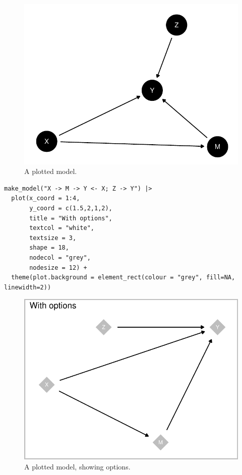\documentclass[
  article]{jss}
\begin{document}
\begin{figure}[H]

{\centering \includegraphics{paper_files/figure-pdf/unnamed-chunk-16-1.pdf}

}

\caption{A plotted model.}

\end{figure}

\begin{verbatim}
make_model("X -> M -> Y <- X; Z -> Y") |>
  plot(x_coord = 1:4,
       y_coord = c(1.5,2,1,2),
       title = "With options",
       textcol = "white",
       textsize = 3,
       shape = 18,
       nodecol = "grey",
       nodesize = 12) +
  theme(plot.background = element_rect(colour = "grey", fill=NA, linewidth=2))
\end{verbatim}

\begin{figure}[H]

{\centering \includegraphics{paper_files/figure-pdf/unnamed-chunk-18-1.pdf}

}

\caption{A plotted model, showing options.}

\end{figure}
\end{document}
